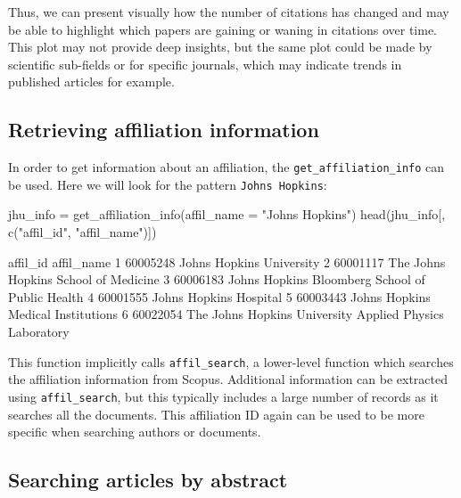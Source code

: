 Thus, we can present visually how the number of citations has changed
and may be able to highlight which papers are gaining or waning in
citations over time. This plot may not provide deep insights, but the
same plot could be made by scientific sub-fields or for specific
journals, which may indicate trends in published articles for example.

\hypertarget{retrieving-affiliation-information}{%
\subsection{Retrieving affiliation
information}\label{retrieving-affiliation-information}}

In order to get information about an affiliation, the
\texttt{get\_affiliation\_info} can be used. Here we will look for the
pattern \texttt{Johns\ Hopkins}:

\begin{Schunk}
\begin{Sinput}
jhu_info = get_affiliation_info(affil_name = "Johns Hopkins")
head(jhu_info[, c("affil_id", "affil_name")])
\end{Sinput}
\begin{Soutput}
  affil_id                                              affil_name
1 60005248                                Johns Hopkins University
2 60001117                    The Johns Hopkins School of Medicine
3 60006183         Johns Hopkins Bloomberg School of Public Health
4 60001555                                  Johns Hopkins Hospital
5 60003443                      Johns Hopkins Medical Institutions
6 60022054 The Johns Hopkins University Applied Physics Laboratory
\end{Soutput}
\end{Schunk}

This function implicitly calls \texttt{affil\_search}, a lower-level
function which searches the affiliation information from Scopus.
Additional information can be extracted using \texttt{affil\_search},
but this typically includes a large number of records as it searches all
the documents. This affiliation ID again can be used to be more specific
when searching authors or documents.

\hypertarget{searching-articles-by-abstract}{%
\subsection{Searching articles by
abstract}\label{searching-articles-by-abstract}}

